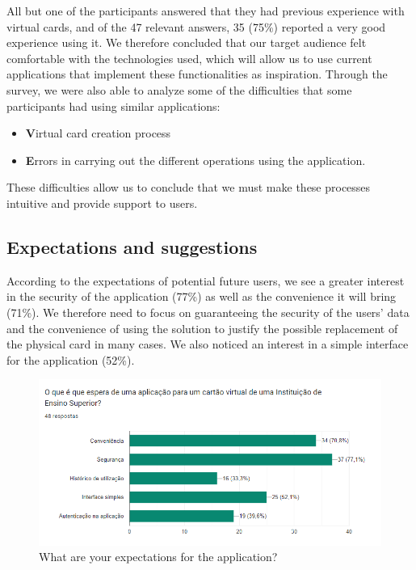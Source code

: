 \documentclass{article}
\begin{document}
All but one of the participants answered that they had previous experience with virtual cards, and of the 47 relevant answers, 35 (75\%) reported a very good experience using it. We therefore concluded that our target audience felt comfortable with the technologies used, which will allow us to use current applications that implement these functionalities as inspiration.
Through the survey, we were also able to analyze some of the difficulties that some participants had using similar applications:
\begin{itemize}
    \item \textbf Virtual card creation process
    \item \textbf Errors in carrying out the different operations using the application.
\end{itemize}


These difficulties allow us to conclude that we must make these processes intuitive and provide support to users.



\subsection{Expectations and suggestions}

According to the expectations of potential future users, we see a greater interest in the security of the application (77\%) as well as the convenience it will bring (71\%). We therefore need to focus on guaranteeing the security of the users' data and the convenience of using the solution to justify the possible replacement of the physical card in many cases.
We also noticed an interest in a simple interface for the application (52\%).

\begin{figure}[h]
    \centering
    \includegraphics[width=1\textwidth]{images/questionaire4.png}
    \caption{What are your expectations for the application?}
\end{figure}
\end{document}
